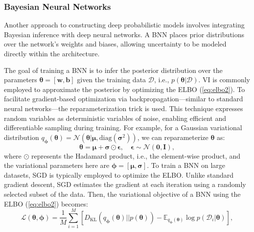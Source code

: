 \subsubsection{Bayesian Neural Networks}
Another approach to constructing deep probabilistic models involves integrating Bayesian inference with deep neural networks. A \acf{BNN} \citep{Neal1996, MacKay1992} places prior distributions over the network’s weights and biases, allowing uncertainty to be modeled directly within the architecture. 

The goal of training a \ac{BNN} is to infer the posterior distribution over the parameters $\boldsymbol{\theta}=[\boldsymbol{w}, \boldsymbol{b}]$ given the training data $\mathcal{D}$, i.e., $p(\boldsymbol{\theta}|\mathcal{D})$. \ac{VI} is commonly employed to approximate the posterior by optimizing the \ac{ELBO} (\ref{eq:elbo2}). 
To facilitate gradient-based optimization via backpropagation---similar to standard neural networks---the reparameterization trick \citep{kingma2013auto} is used. This technique expresses random variables as deterministic variables of noise, enabling efficient and differentiable sampling during training. For example, for a Gaussian variational distribution $q_{\boldsymbol{\phi}}(\boldsymbol{\theta})=\mathcal{N}(\boldsymbol{\theta}|\boldsymbol{\mu}, \text{diag}(\boldsymbol{\sigma}^2))$, we can reparameterize $\boldsymbol{\theta}$ as:  
\begin{equation}
    \boldsymbol{\theta} = \boldsymbol{\mu} + \boldsymbol{\sigma} \odot \boldsymbol{\epsilon}, \quad \boldsymbol{\epsilon}\sim\mathcal{N}(\boldsymbol{0}, \boldsymbol{I}),
\end{equation}  
where $\odot$ represents the Hadamard product, i.e., the element-wise product, and the variational parameters here are $\boldsymbol{\phi}=[\boldsymbol{\mu}, \boldsymbol{\sigma}]$. 
To train a \ac{BNN} on large datasets, \ac{SGD} \citep{bottou1999sgd} is typically employed to optimize the \ac{ELBO}. Unlike standard gradient descent, \ac{SGD} estimates the gradient at each iteration using a randomly selected subset of the data. Then, the variational objective of a \ac{BNN} using the \ac{ELBO} (\ref{eq:elbo2}) becomes:
\begin{equation}
    \mathcal{L}(\boldsymbol{\theta}, \boldsymbol{\phi}) = \frac{1}{M}\sum_{i=1}^{M} [D_{\text{KL}}(q_{\boldsymbol{\phi}}(\boldsymbol{\theta})||p(\boldsymbol{\theta}))-\mathbb{E}_{q_{\boldsymbol{\phi}}(\boldsymbol{\theta})}\log p(\mathcal{D}_i|\boldsymbol{\theta})],
\end{equation}
